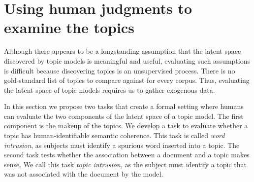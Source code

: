 %



\section{Using human judgments to examine the topics}
\label{sec:tasks}


Although there appears to be a longstanding assumption that the latent
space discovered by topic models is meaningful and useful, evaluating
such assumptions is difficult because discovering topics is an
unsupervised process.  There is no gold-standard list of topics to
compare against for every corpus.  Thus, evaluating the latent space
of topic models requires us to gather exogenous data.

In this section we propose two tasks that create a formal setting
where humans can evaluate the two components of the latent space of a
topic model.  The first component is the makeup of the topics.  We
develop a task to evaluate whether a topic has human-identifiable
semantic coherence.  This task is called \emph{word intrusion}, as
subjects must identify a spurious word inserted into a topic.  The
second task tests whether the association between a document and a
topic makes sense.  We call this task \emph{topic intrusion}, as the
subject must identify a topic that was not associated with the
document by the model.


